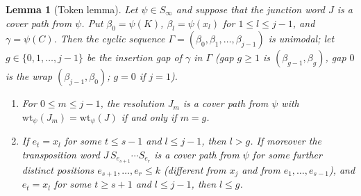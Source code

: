\documentclass{amsart}
\newtheorem{lemma}{Lemma}[section]
\theoremstyle{definition}
\theoremstyle{remark}
\numberwithin{equation}{section}
\begin{document}
\begin{lemma}[Token lemma] \label{lemma:token}
Let $\psi\in S_\infty$ and suppose that the junction word $J$ is a cover path from $\psi$. Put $\beta_0=\psi(K)$, $\beta_l=\psi(x_l)$ for $1\leq l\leq j-1$, and $\gamma=\psi(C)$. Then the cyclic sequence $\Gamma=(\beta_0,\beta_1,\ldots,\beta_{j-1})$ is unimodal; let $g\in\{0,1,\ldots,j-1\}$ be the insertion gap of $\gamma$ in $\Gamma$ (gap $g\geq1$ is $(\beta_{g-1},\beta_g)$, gap $0$ is the wrap $(\beta_{j-1},\beta_0)$; $g=0$ if $j=1$).
\begin{enumerate}
\item[(i)] For $0\leq m\leq j-1$, the resolution $J_m$ is a cover path from $\psi$ with $\mathrm{wt}_\psi(J_m)=\mathrm{wt}_\psi(J)$ if and only if $m=g$.
\item[(ii)] If $e_t=x_l$ for some $t\leq s-1$ and $l\leq j-1$, then $l>g$. If moreover the transposition word $J\,S_{e_{s+1}}\cdots S_{e_r}$ is a cover path from $\psi$ for some further distinct positions $e_{s+1},\ldots,e_r\leq k$ (different from $x_j$ and from $e_1,\ldots,e_{s-1}$), and $e_t=x_l$ for some $t\geq s+1$ and $l\leq j-1$, then $l\leq g$.
\end{enumerate}
\end{lemma}
\end{document}
